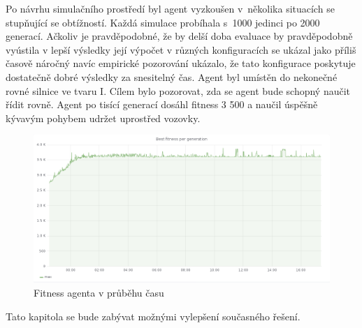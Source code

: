 Po návrhu simulačního prostředí byl agent vyzkoušen v~několika situacích se stupňující se obtížností. Každá simulace probíhala s~1000 jedinci po 2000 generací. Ačkoliv je pravděpodobné, že by delší doba evaluace by pravděpodobně vyústila v lepší výsledky její výpočet v různých konfiguracích se ukázal jako příliš časově náročný navíc empirické pozorování ukázalo, že tato konfigurace poskytuje dostatečně dobré výsledky za snesitelný čas. 
Agent byl umístěn do nekonečné rovné silnice ve tvaru I. Cílem bylo pozorovat, zda se agent bude schopný naučit řídit rovně. Agent po tisící generací dosáhl fitness 3 500 a naučil úspěšně kývavým pohybem udržet uprostřed vozovky.
\begin{figure}[h]
	\centering
	\includegraphics[scale=0.4]{I_fitness}
	\caption{Fitness agenta v průběhu času}
	\label{fig:i-experiment}
\end{figure}

Tato kapitola se bude zabývat možnými vylepšení současného řešení.
